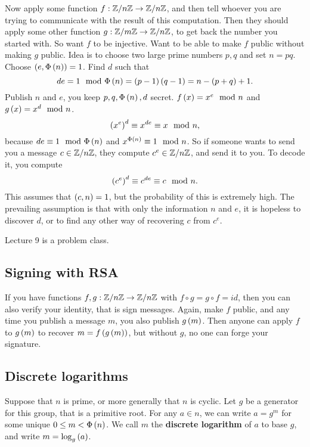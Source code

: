 Now apply some function $ f : \mathbb{Z} / n\mathbb{Z} \to \mathbb{Z} / n\mathbb{Z} $, and then tell whoever you are trying to communicate with the result of this computation. Then they should apply some other function $ g : \mathbb{Z} / m\mathbb{Z} \to \mathbb{Z} / n\mathbb{Z} $, to get back the number you started with. So want $ f $ to be injective. Want to be able to make $ f $ public without making $ g $ public. Idea is to choose two large prime numbers $ p, q $ and set $ n = pq $. Choose $ \left( e, \Phi\left( n \right) \right) = 1 $. Find $ d $ such that
$$ de = 1 \mod \Phi\left( n \right) = \left( p - 1 \right)\left( q - 1 \right) = n - \left( p + q \right) + 1. $$
Publish $ n $ and $ e $, you keep $ p, q, \Phi\left( n \right), d $ secret. $ f\left( x \right) = x^e \mod n $ and $ g\left( x \right) = x^d \mod n $.
$$ \left( x^e \right)^d \equiv x^{de} \equiv x \mod n, $$
because $ de \equiv 1 \mod \Phi\left( n \right) $ and $ x^{\Phi\left( n \right)} \equiv 1 \mod n $. So if someone wants to send you a message $ c \in \mathbb{Z} / n\mathbb{Z} $, they compute $ c^e \in \mathbb{Z} / n\mathbb{Z} $, and send it to you. To decode it, you compute
$$ \left( c^e \right)^d \equiv c^{de} \equiv c \mod n. $$
This assumes that $ \left( c, n \right) = 1 $, but the probability of this is extremely high. The prevailing assumption is that with only the information $ n $ and $ e $, it is hopeless to discover $ d $, or to find any other way of recovering $ c $ from $ c^e $.


Lecture 9 is a problem class.

\subsection{Signing with RSA}

If you have functions $ f, g : \mathbb{Z} / n\mathbb{Z} \to \mathbb{Z} / n\mathbb{Z} $ with $ f \circ g = g \circ f = id $, then you can also verify your identity, that is sign messages. Again, make $ f $ public, and any time you publish a message $ m $, you also publish $ g\left( m \right) $. Then anyone can apply $ f $ to $ g\left( m \right) $ to recover $ m = f\left( g\left( m \right) \right) $, but without $ g $, no one can forge your signature.


\subsection{Discrete logarithms}

Suppose that $ n $ is prime, or more generally that $ \unit{n} $ is cyclic. Let $ g $ be a generator for this group, that is a primitive root. For any $ a \in \unit{n} $, we can write $ a = g^m $ for some unique $ 0 \le m < \Phi\left( n \right) $. We call $ m $ the \textbf{discrete logarithm} of $ a $ to base $ g $, and write $ m = \log_g\left( a \right) $.

